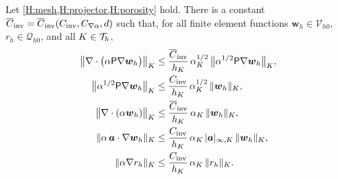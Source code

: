 \begin{lemma}\label{lem:winv}
Let \cref{H:mesh,H:projector,H:porosity} hold. There is a constant
$\overline{C}_{\mathrm{inv}} = \overline{C}_{\mathrm{inv}}(C_{\mathrm{inv}},C_{\nabla\alpha},d)$ such that, for all
finite element functions $\boldsymbol{w}_h\in\mathcal{V}_{h0}$,
$r_h\in\mathcal{Q}_{h0}$, and all $K\in\mathcal{T}_h$,
\begin{align}
  \bigl\lVert\nabla\cdot\bigl(\alpha\mathsf{P}\nabla\boldsymbol{w}_h\bigr)
  \bigr\rVert_{K}
  &\le \frac{\overline{C}_{\mathrm{inv}}}{h_K}\,\alpha_K^{1/2}\,
  \bigl\lVert\alpha^{1/2}\mathsf{P}\nabla\boldsymbol{w}_h\bigr\rVert_{K},
  \label{eq:winv-divvisc}\\
  \bigl\lVert\alpha^{1/2}\mathsf{P}\nabla\boldsymbol{w}_h\bigr\rVert_{K}
  &\le \frac{C_{\mathrm{inv}}}{h_K}\,\alpha_K^{1/2}\,
  \lVert\boldsymbol{w}_h\rVert_{K},
  \label{eq:winv-grad}\\
  \bigl\lVert\nabla\cdot(\alpha\boldsymbol{w}_h)\bigr\rVert_{K}
  &\le \frac{\overline{C}_{\mathrm{inv}}}{h_K}\,\alpha_K\,\lVert\boldsymbol{w}_h\rVert_{K},
  \label{eq:winv-divu}\\
  \lVert\alpha\,\boldsymbol{a}\cdot\nabla\boldsymbol{w}_h\rVert_{K}
  &\le \frac{C_{\mathrm{inv}}}{h_K}\,\alpha_K\,|\boldsymbol{a}|_{\infty,K}\,
  \lVert\boldsymbol{w}_h\rVert_{K},
  \label{eq:winv-conv}\\
  \lVert\alpha\nabla r_h\rVert_{K}
  &\le \frac{C_{\mathrm{inv}}}{h_K}\,\alpha_K\,\lVert r_h\rVert_{K}.
  \label{eq:winv-gradp}
\end{align}
\end{lemma}

